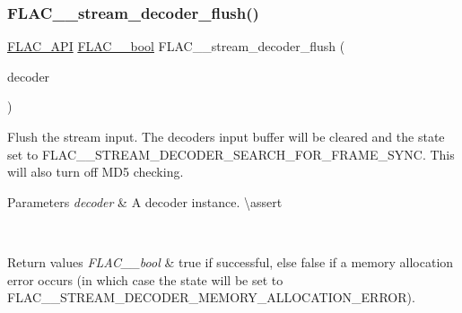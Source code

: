 \subsubsection{\texorpdfstring{FLAC\_\_stream\_decoder\_flush()}{FLAC\_\_stream\_decoder\_flush()}}
{\footnotesize\ttfamily \mbox{\hyperlink{group__flac__export_ga56ca07df8a23310707732b1c0007d6f5}{F\+L\+A\+C\+\_\+\+A\+PI}} \mbox{\hyperlink{ordinals_8h_a95103469f1cbd78b8cf250194985b34e}{F\+L\+A\+C\+\_\+\+\_\+bool}} F\+L\+A\+C\+\_\+\+\_\+stream\+\_\+decoder\+\_\+flush (\begin{DoxyParamCaption}\item[{\mbox{\hyperlink{struct_f_l_a_c_____stream_decoder}{F\+L\+A\+C\+\_\+\+\_\+\+Stream\+Decoder}} $\ast$}]{decoder }\end{DoxyParamCaption})}

Flush the stream input. The decoder\textquotesingle{}s input buffer will be cleared and the state set to {\ttfamily F\+L\+A\+C\+\_\+\+\_\+\+S\+T\+R\+E\+A\+M\+\_\+\+D\+E\+C\+O\+D\+E\+R\+\_\+\+S\+E\+A\+R\+C\+H\+\_\+\+F\+O\+R\+\_\+\+F\+R\+A\+M\+E\+\_\+\+S\+Y\+NC}. This will also turn off M\+D5 checking.


\begin{DoxyParams}{Parameters}
{\em decoder} & A decoder instance. \textbackslash{}assert 
\begin{DoxyCode}{1}
\end{DoxyCode}
 \\
\hline
\end{DoxyParams}

\begin{DoxyRetVals}{Return values}
{\em F\+L\+A\+C\+\_\+\+\_\+bool} & {\ttfamily true} if successful, else {\ttfamily false} if a memory allocation error occurs (in which case the state will be set to {\ttfamily F\+L\+A\+C\+\_\+\+\_\+\+S\+T\+R\+E\+A\+M\+\_\+\+D\+E\+C\+O\+D\+E\+R\+\_\+\+M\+E\+M\+O\+R\+Y\+\_\+\+A\+L\+L\+O\+C\+A\+T\+I\+O\+N\+\_\+\+E\+R\+R\+OR}). \\
\hline
\end{DoxyRetVals}
\mbox{\label{group__flac__stream__decoder_ga2e4bae93f2ebf49babd88bb5fe54bd24}} 
